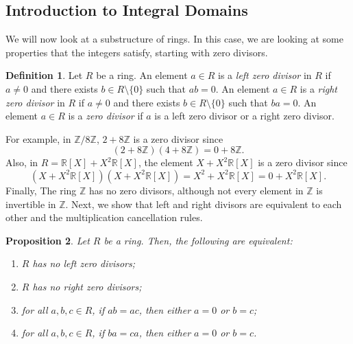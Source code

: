 \documentclass[a4paper, openany]{memoir}
\theoremstyle{definition}
\newtheorem{definition}{Definition}[section]
\theoremstyle{plain}
\newtheorem{proposition}[definition]{Proposition}
\begin{document}
\subsection{Introduction to Integral Domains}
We will now look at a substructure of rings. In this case, we are looking at some properties that the integers satisfy, starting with zero divisors.
\begin{definition}
Let $R$ be a ring. An element $a \in R$ is a \emph{left zero divisor} in $R$ if $a \neq 0$ and there exists $b \in R \setminus \{0\}$ such that $ab = 0$. An element $a \in R$ is a \emph{right zero divisor} in $R$ if $a \neq 0$ and there exists $b \in R \setminus \{0\}$ such that $ba = 0$. An element $a \in R$ is a \emph{zero divisor} if $a$ is a left zero divisor or a right zero divisor.
\end{definition}
\noindent For example, in $\mathbb{Z}/8 \mathbb{Z}$, $2 + 8\mathbb{Z}$ is a zero divisor since
\[(2 + 8\mathbb{Z})(4 + 8\mathbb{Z}) = 0 + 8\mathbb{Z}.\]
Also, in $R = \mathbb{R}[X] + X^2 \mathbb{R}[X]$, the element $X + X^2 \mathbb{R}[X]$ is a zero divisor since
\[(X + X^2 \mathbb{R}[X])(X + X^2 \mathbb{R}[X]) = X^2 + X^2 \mathbb{R}[X] = 0 + X^2 \mathbb{R}[X].\]
Finally, The ring $\mathbb{Z}$ has no zero divisors, although not every element in $\mathbb{Z}$ is invertible in $\mathbb{Z}$. Next, we show that left and right divisors are equivalent to each other and the multiplication cancellation rules.
\begin{proposition}
Let $R$ be a ring. Then, the following are equivalent:
\begin{enumerate}[label=(\arabic*)]
    \item $R$ has no left zero divisors;
    \item $R$ has no right zero divisors;
    \item for all $a, b, c \in R$, if $ab = ac$, then either $a = 0$ or $b = c$;
    \item for all $a, b, c \in R$, if $ba = ca$, then either $a = 0$ or $b = c$.
\end{enumerate}
\end{proposition}
\end{document}
